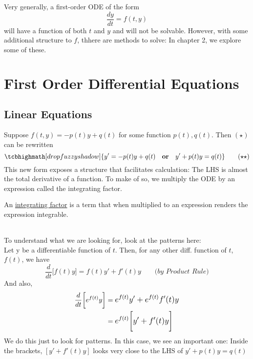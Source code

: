 Very generally, a first-order ODE of the form
\begin{equation*}
	\dfrac{dy}{dt} = f(t, y)
\end{equation*}
will have a function of both $t$ and $y$ and will not be solvable. However, with some additional structure to $f$, thhere are methods to solve:  In chapter 2, we explore some of these.

\section*{First Order Differential Equations}
\subsection*{Linear Equations}
Suppose $f(t, y) = -p(t)y+q(t)$ for some function $p(t), q(t)$. Then $(\star)$ can be rewritten
\begin{equation*}
	\tcbhighmath[drop fuzzy shadow]{y' = -p(t)y+q(t) \quad \text{\textbf{or}} \quad
	y'+p(t)y= q(t)} \tag{$\star\star$}
\end{equation*}
This new form exposes a structure that facilitates calculation: The LHS is almost the total derivative of a function. To make of so, we multiply the ODE by an expression called the integrating factor.
\begin{definition-N}
	An \underline{integrating factor} is a term that when multiplied to an expression renders the expression integrable.
\end{definition-N}
\redhline\\
\newcommand{\intfac}{e^{\int p(t) dt}}
To understand what we are looking for, look at the patterns here:\\
Let y be a differentiable function of $t$. Then, for any other diff. function of $t$, $f(t)$, we have
\begin{equation*}
	\dfrac{d}{dt}\bigg[f(t)y\bigg] = f(t)y' + f'(t)y \quad \quad \textit{(by Product Rule)}
\end{equation*}
And also,
\begin{equation*}
	\begin{split}
		\dfrac{d}{dt}\bigg[e^{f(t)}y\bigg] & = \mathlarger{e^{f(t)}y' + e^{f(t)}f'(t)y}\\
		& = \mathlarger{e^{f(t)}\bigg[y' + f'(t)y\bigg]}
	\end{split}
\end{equation*}
We do this just to look for patterns. In this case, we see an important one: Inside the brackets, $[y' + f'(t)y]$ looks very close to the LHS of $y'+p(t)y= q(t)$\\
